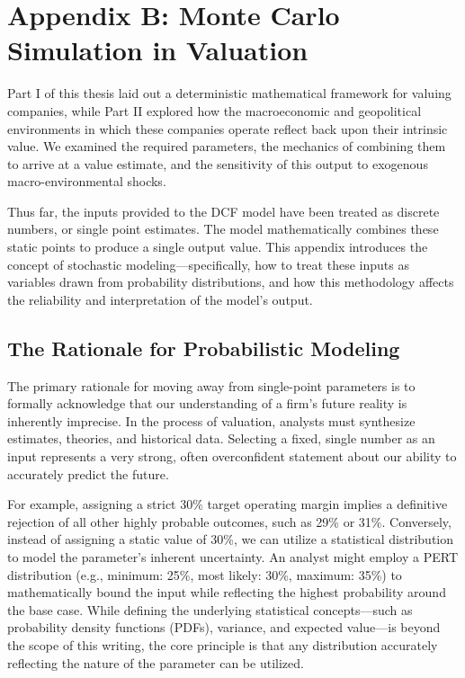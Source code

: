 \cleardoublepage
{}
{}
\chapter*{Appendix B: Monte Carlo Simulation in Valuation}

Part I of this thesis laid out a deterministic mathematical framework for valuing companies, while Part II explored how the macroeconomic and geopolitical environments in which these companies operate reflect back upon their intrinsic value. We examined the required parameters, the mechanics of combining them to arrive at a value estimate, and the sensitivity of this output to exogenous macro-environmental shocks.

Thus far, the inputs provided to the DCF model have been treated as discrete numbers, or single point estimates. The model mathematically combines these static points to produce a single output value. This appendix introduces the concept of stochastic modeling—specifically, how to treat these inputs as variables drawn from probability distributions, and how this methodology affects the reliability and interpretation of the model's output.

\section*{The Rationale for Probabilistic Modeling}

The primary rationale for moving away from single-point parameters is to formally acknowledge that our understanding of a firm's future reality is inherently imprecise. In the process of valuation, analysts must synthesize estimates, theories, and historical data. Selecting a fixed, single number as an input represents a very strong, often overconfident statement about our ability to accurately predict the future.

For example, assigning a strict 30\% target operating margin implies a definitive rejection of all other highly probable outcomes, such as 29\% or 31\%. Conversely, instead of assigning a static value of 30\%, we can utilize a statistical distribution to model the parameter's inherent uncertainty. An analyst might employ a PERT distribution (e.g., minimum: 25\%, most likely: 30\%, maximum: 35\%) to mathematically bound the input while reflecting the highest probability around the base case. While defining the underlying statistical concepts—such as probability density functions (PDFs), variance, and expected value—is beyond the scope of this writing, the core principle is that any distribution accurately reflecting the nature of the parameter can be utilized.

